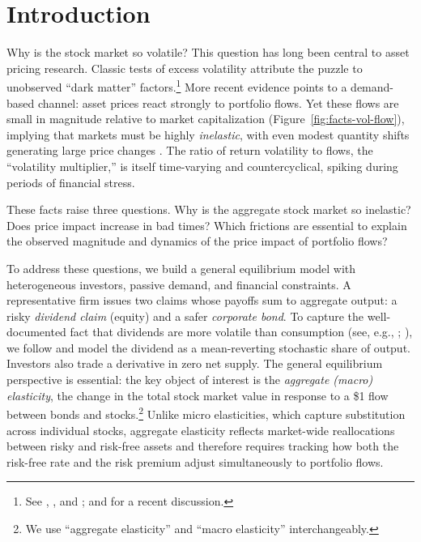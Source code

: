 \documentclass[12pt,english]{article}
\begin{document}
\newpage
\doublespacing
\setcounter{page}{1}
	

\newpage

% 
\section{Introduction}\label{sec:intro}
\noindent Why is the stock market so volatile? This question has long been central to asset pricing research. Classic tests of excess volatility attribute the puzzle to unobserved ``dark matter'' factors.\footnote{See \citet{leroy1981present}, \citet{shiller1981,shiller1992market}, and \citet{cochrane1992explaining}; and \citet{chen2024measuring} for a recent discussion.} More recent evidence points to a demand-based channel: asset prices react strongly to portfolio flows. Yet these flows are small in magnitude relative to market capitalization (Figure~\ref{fig:facts-vol-flow}), implying that markets must be highly \emph{inelastic}, with even modest quantity shifts generating large price changes \citep{gabaix2020search}. The ratio of return volatility to flows, the ``volatility multiplier,'' is itself time-varying and countercyclical, spiking during periods of financial stress.

These facts raise three questions. Why is the aggregate stock market so inelastic? Does price impact increase in bad times? Which frictions are essential to explain the observed magnitude and dynamics of the price impact of portfolio flows?

To address these questions, we build a general equilibrium model with heterogeneous investors, passive demand, and financial constraints. A representative firm issues two claims whose payoffs sum to aggregate output: a risky \emph{dividend claim} (equity) and a safer \emph{corporate bond}. To capture the well-documented fact that dividends are more volatile than consumption (see, e.g., \citealt{Abel1999LeverageDividends}; \citealt{Campbell1999AssetPrices}), we follow \citet{MenzlySantosVeronesi2004} and model the dividend as a mean-reverting stochastic share of output. Investors also trade a derivative in zero net supply. The general equilibrium perspective is essential: the key object of interest is the \emph{aggregate (macro) elasticity}, the change in the total stock market value in response to a \$1 flow between bonds and stocks.\footnote{We use ``aggregate elasticity'' and ``macro elasticity'' interchangeably.} Unlike micro elasticities, which capture substitution across individual stocks, aggregate elasticity reflects market-wide reallocations between risky and risk-free assets and therefore requires tracking how both the risk-free rate and the risk premium adjust simultaneously to portfolio flows.
\end{document}
